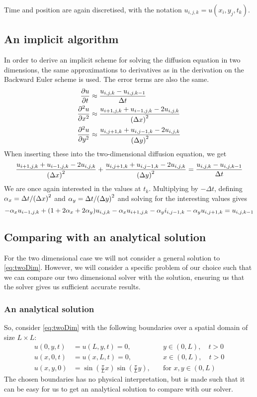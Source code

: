 \documentclass[12pt,english,a4paper]{article}
\begin{document}
Time and position are again discretised, with the notation \(u_{i,j,k} = u(x_i,y_j,t_k)\).

\subsection{An implicit algorithm}
In order to derive an implicit scheme for solving the diffusion equation in two dimensions, the same approximations to derivatives as in the derivation on the Backward Euler scheme is used. The error terms are also the same.
\begin{alignat*}{2}
    \pdv{u}{t} &\approx \frac{u_{i,j,k} - u_{i,j,k-1}}{\Delta t}\\
    \pdv[2]{u}{x} &\approx \frac{u_{i+1,j,k} + u_{i-1,j,k} - 2u_{i,j,k}}{\qty(\Delta x)^2}\\
    \pdv[2]{u}{y} &\approx \frac{u_{i,j+1,k} + u_{i,j-1,k} - 2u_{i,j,k}}{\qty(\Delta y)^2}
\end{alignat*}
When inserting these into the two-dimensional diffusion equation, we get
\[
    \frac{u_{i+1,j,k} + u_{i-1,j,k} - 2u_{i,j,k}}{\qty(\Delta x)^2} +
    \frac{u_{i,j+1,k} + u_{i,j-1,k} - 2u_{i,j,k}}{\qty(\Delta y)^2} =
    \frac{u_{i,j,k} - u_{i,j,k-1}}{\Delta t}
\]
We are once again interested in the values at \(t_k\). Multiplying by \(-\Delta t\), defining \(\alpha_x=\Delta t/\qty(\Delta x)^2\) and \(\alpha_y=\Delta t/\qty(\Delta y)^2\) and solving for the interesting values gives
\[
    -\alpha_x u_{i-1,j,k} + \qty(1+2\alpha_x+2\alpha_y)u_{i,j,k} - \alpha_x u_{i+1,j,k} - \alpha_y i_{i,j-1,k} - \alpha_y u_{i,j+1,k} = u_{i,j,k-1}
\]

\subsection{Comparing with an analytical solution}
For the two dimensional case we will not consider a general solution to \vref{eq:twoDim}. However, we will consider a specific problem of our choice such that we can compare our two dimensional solver with the solution, ensuring us that the solver gives us sufficient accurate results.
\subsubsection{An analytical solution}
So, consider \vref{eq:twoDim} with the following boundaries over a spatial domain of size \(L \times L\):
\begin{equation} \label{eq:twoDimBoundaries}
\begin{aligned}
u(0,y,t) &= u(L,y,t) = 0, \quad &y \in (0,L),\quad t > 0 \\
u(x,0,t) &= u(x,L,t) = 0, \quad &x \in (0,L),\quad t > 0 \\
u(x,y,0) &= \sin(\frac{\pi}{L}x)\sin(\frac{\pi}{L}y), \quad&\text{for }x,y\in (0,L)
\end{aligned}
\end{equation}
The chosen boundaries has no physical interpretation, but is made such that it can be easy for us to get an analytical solution to compare with our solver.
\end{document}
